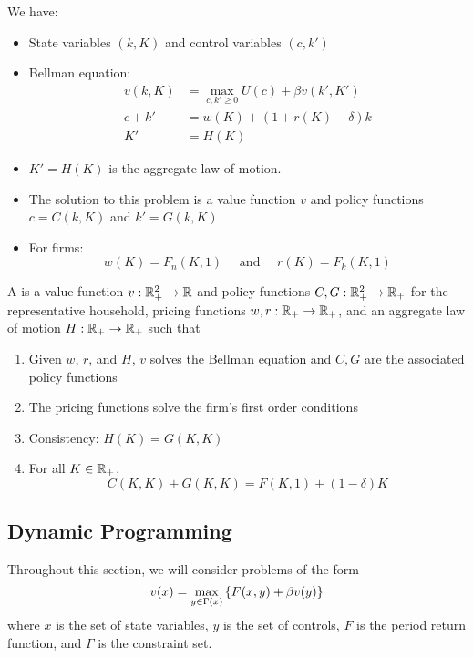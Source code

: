 \documentclass[10pt]{article}
\begin{document}
\begin{model}
	 We have:
	\begin{itemize}
		\item State variables $(k, K)$ and control variables $(c,k')$
		\item Bellman equation:
		\begin{align*}
			v(k,K) &= \max_{c,k' \ge 0} U(c) + \beta v(k',K') \\
			c + k' &= w(K) + (1 + r(K) - \delta)k \\
			K' &= H(K)
		\end{align*}
		\item $K' = H(K)$ is the aggregate law of motion.
		\item The solution to this problem is a value function $v$ and policy functions $c = C(k,K)$ and $k' = G(k,K)$
		\item For firms:
		\[
		w(K) = F_n(K,1) \quad \text{ and } \quad r(K) = F_k(K,1)
		\]
	\end{itemize}
\end{model}

\begin{definition}
	A  is a value function $v : \mathbb{R}^2_+ \to \mathbb{R}$ and policy functions $C,G: \mathbb{R}^2_+ \to \mathbb{R}_+$ for the representative household, pricing functions $w,r : \mathbb{R}_+ \to \mathbb{R}_+$, and an aggregate law of motion $H: \mathbb{R}_+ \to \mathbb{R}_+$ such that
	\begin{enumerate}
		\item Given $w$, $r$, and $H$, $v$ solves the Bellman equation and $C,G$ are the associated policy functions
		\item The pricing functions solve the firm's first order conditions
		\item Consistency: $H(K) = G(K,K)$
		\item For all $K \in \mathbb{R}_+$,
		\[
		C(K,K) + G(K,K) = F(K,1) + (1-\delta)K
		\]
	\end{enumerate}
\end{definition}

\newpage

\subsection{Dynamic Programming}

Throughout this section, we will consider problems of the form 
\[
v(x) = \max_{y \in \Gamma(x)} \left\{ F(x,y) + \beta v(y) \right\}
\]
where $x$ is the set of state variables, $y$ is the set of controls, $F$ is the period return function, and $\Gamma$ is the constraint set.
\end{document}
